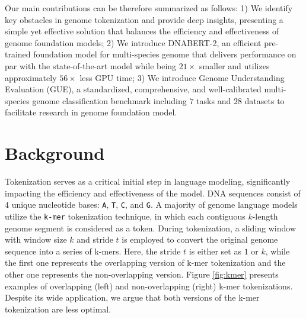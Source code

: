 \documentclass{article}
\begin{document}
Our main contributions can be therefore summarized as follows: 1) We identify key obstacles in genome tokenization and provide deep insights, presenting a simple yet effective solution that balances the efficiency and effectiveness of genome foundation models;  2) We introduce DNABERT-2, an efficient pre-trained foundation model for multi-species genome that delivers performance on par with the state-of-the-art model while being $21 \times$ smaller and utilizes approximately $56 \times$ less GPU time; 3) We introduce Genome Understanding Evaluation (GUE), a standardized, comprehensive, and well-calibrated multi-species genome classification benchmark including $7$ tasks and $28$ datasets to facilitate research in genome foundation model.



\section{Background}
\label{sec:background}





\begin{figure*}[t]
		\centering
		\caption{Illustration of the drawbacks of k-mer tokenization. In the overlapping setting, information about a masked token is leaked by its adjacent tokens, while in the non-overlapping setting, adding/deleting one nucleotide base leads to a dramatic change in the tokenized sequence. }
		\label{fig:kmer}
\end{figure*}

Tokenization serves as a critical initial step in language modeling, significantly impacting the efficiency and effectiveness of the model. DNA sequences consist of $4$ unique nucleotide bases: \texttt{A}, \texttt{T}, \texttt{C}, and \texttt{G}. A majority of genome language models \citep{dnabert, nt} utilize the \texttt{k-mer} tokenization technique, in which each contiguous $k$-length genome segment is considered as a token. 
During tokenization, a sliding window with window size $k$ and stride $t$ is employed to convert the original genome sequence into a series of k-mers. Here, the stride $t$ is either set as $1$ or $k$, while the first one represents the overlapping version of k-mer tokenization and the other one represents the non-overlapping version. 
Figure \ref{fig:kmer} presents examples of overlapping (left) and non-overlapping (right) k-mer tokenizations.
Despite its wide application, we argue that both versions of the k-mer tokenization are less optimal.
\end{document}
